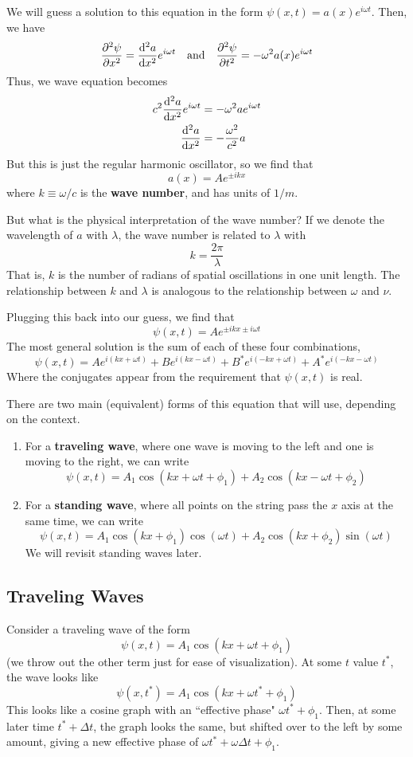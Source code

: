 We will guess a solution to this equation in the form $\psi(x,t) = a(x)e^{i\omega t}$. Then, we have
\[ \pdv[2]{\psi}{x} = \dv[2]{a}{x} e^{i\omega t}\quad\text{and}\quad \pdv[2]{\psi}{t} = -\omega^2 a(x)e^{i\omega t}\]
Thus, we wave equation becomes
\begin{align*}
    c^2\dv[2]{a}{x}e^{i\omega t} &= -\omega^2 a e^{i\omega t} \\
    \dv[2]{a}{x} &= -\frac{\omega^2}{c^2} a
\end{align*}
But this is just the regular harmonic oscillator, so we find that 
\[ a(x) = Ae^{\pm ikx} \]
where $k\equiv \omega/c$ is the \textbf{wave number}, and has units of $1/m$. 

But what is the physical interpretation of the wave number? If we denote the wavelength of $a$ with $\lambda$, the wave number is related to $\lambda$ with
\[ k = \frac{2\pi}{\lambda} \]
That is, $k$ is the number of radians of spatial oscillations in one unit length. The relationship between $k$ and $\lambda$ is analogous to the relationship between $\omega$ and $\nu$.

Plugging this back into our guess, we find that
\[ \psi(x,t) = Ae^{\pm ikx \pm i\omega t}\]
The most general solution is the sum of each of these four combinations,
\[ \psi(x,t) = Ae^{i(kx+\omega t)} + Be^{i(kx-\omega t)} + B^{*}e^{i(-kx+\omega t)} + A^{*}e^{i(-kx-\omega t)} \]
Where the conjugates appear from the requirement that $\psi(x,t)$ is real.

There are two main (equivalent) forms of this equation that will use, depending on the context.
\begin{enumerate}
    \item For a \textbf{traveling wave}, where one wave is moving to the left and one is moving to the right, we can write
    \[ \psi(x,t) = A_1\cos(kx + \omega t + \phi_1) + A_2\cos(kx - \omega t + \phi_2)\]
    \item For a \textbf{standing wave}, where all points on the string pass the $x$ axis at the same time, we can write
    \[ \psi(x,t) = A_1 \cos(kx+\phi_1)\cos(\omega t) + A_2\cos(kx+\phi_2)\sin(\omega t)\]
    We will revisit standing waves later.
\end{enumerate}
\subsection*{Traveling Waves}
Consider a traveling wave of the form
\[ \psi(x,t) = A_1\cos(kx + \omega t +\phi_1) \]
(we throw out the other term just for ease of visualization). At some $t$ value $t^*$, the wave looks like
\[ \psi(x, t^*) = A_1\cos(kx + \omega t^* + \phi_1) \]
This looks like a cosine graph with an ``effective phase" $\omega t^* + \phi_1$. Then, at some later time $t^* + \Delta t$, the graph looks the same, but shifted over to the left by some amount, giving a new effective phase of $\omega t^* + \omega \Delta t + \phi_1$. 

